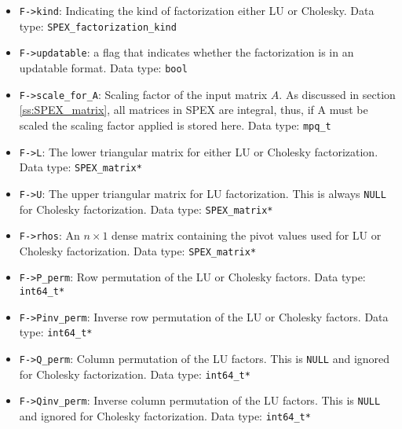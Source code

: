 \documentclass[12pt]{report}
\theoremstyle{definition}
\begin{document}
\begin{itemize}
\item \verb|F->kind|: Indicating the kind of factorization either LU or Cholesky. Data type: \verb|SPEX_factorization_kind|

\item \verb|F->updatable|: a flag that indicates whether the factorization is in an updatable format. Data type: \verb|bool|

\item \verb|F->scale_for_A|: Scaling factor of the input matrix $A$. As discussed in section \ref{ss:SPEX_matrix}, all matrices in SPEX are integral, thus, if A must be scaled the scaling factor applied is stored here. Data type: \verb|mpq_t|

\item \verb|F->L|: The lower triangular matrix for either LU or Cholesky factorization. Data type: \verb|SPEX_matrix*|

\item \verb|F->U|: The upper triangular matrix for LU factorization. This is always \verb|NULL| for Cholesky factorization. Data type: \verb|SPEX_matrix*|

\item \verb|F->rhos|: An $n \times 1$ dense matrix containing the pivot values used for LU or Cholesky factorization. Data type: \verb|SPEX_matrix*|

\item \verb|F->P_perm|: Row permutation of the LU or Cholesky factors. Data type: \verb|int64_t*|

\item \verb|F->Pinv_perm|: Inverse row permutation of the LU or Cholesky factors. Data type: \verb|int64_t*|

\item \verb|F->Q_perm|: Column permutation of the LU factors. This is \verb|NULL| and ignored for Cholesky factorization. Data type: \verb|int64_t*|

\item \verb|F->Qinv_perm|: Inverse column permutation of the LU factors. This is \verb|NULL| and ignored for Cholesky factorization. Data type: \verb|int64_t*|
\end{itemize}
\end{document}
